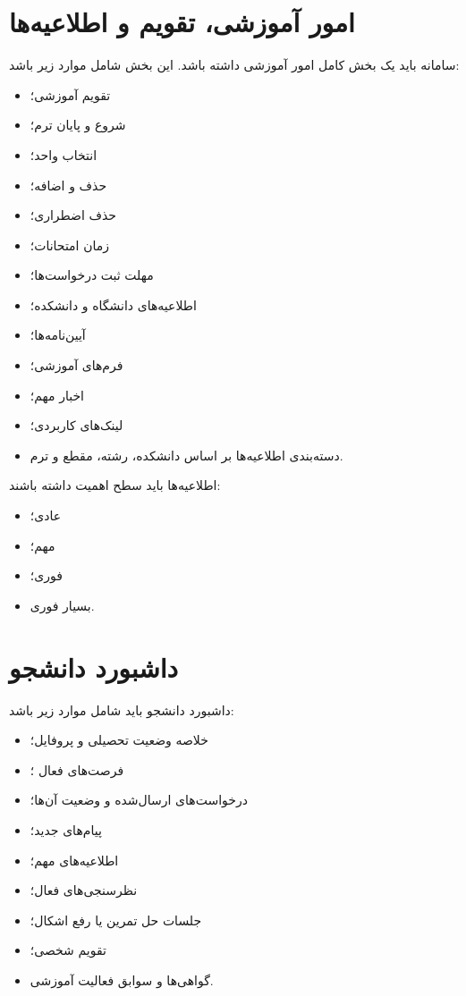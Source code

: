 \documentclass[12pt,a4paper]{article}
\begin{document}
\section{امور آموزشی، تقویم و اطلاعیه‌ها}
سامانه باید یک بخش کامل امور آموزشی داشته باشد. این بخش شامل موارد زیر باشد:
\begin{itemize}
\item تقویم آموزشی؛
\item شروع و پایان ترم؛
\item انتخاب واحد؛
\item حذف و اضافه؛
\item حذف اضطراری؛
\item زمان امتحانات؛
\item مهلت ثبت درخواست‌ها؛
\item اطلاعیه‌های دانشگاه و دانشکده؛
\item آیین‌نامه‌ها؛
\item فرم‌های آموزشی؛
\item اخبار مهم؛
\item لینک‌های کاربردی؛
\item دسته‌بندی اطلاعیه‌ها بر اساس دانشکده، رشته، مقطع و ترم.
\end{itemize}

اطلاعیه‌ها باید سطح اهمیت داشته باشند:
\begin{itemize}
\item عادی؛
\item مهم؛
\item فوری؛
\item بسیار فوری.
\end{itemize}

\section{داشبورد دانشجو}
داشبورد دانشجو باید شامل موارد زیر باشد:
\begin{itemize}
\item خلاصه وضعیت تحصیلی و پروفایل؛
\item فرصت‌های فعال ؛
\item درخواست‌های ارسال‌شده و وضعیت آن‌ها؛
\item پیام‌های جدید؛
\item اطلاعیه‌های مهم؛
\item نظرسنجی‌های فعال؛
\item جلسات حل تمرین یا رفع اشکال؛
\item تقویم شخصی؛
\item گواهی‌ها و سوابق فعالیت آموزشی.
\end{itemize}
\end{document}

